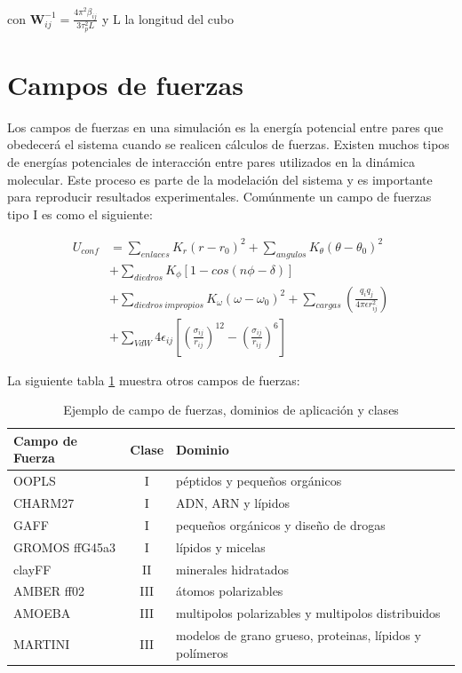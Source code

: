 con $\mathbf{W}^{-1}_{ij}=\frac{4\pi^2 \beta_{ij}}{3\tau_{p}^2 L}$ y L la longitud del cubo

\section{Campos de fuerzas}

Los campos de fuerzas en una simulación es la energía potencial entre pares que obedecerá el sistema cuando se realicen cálculos de fuerzas. Existen muchos tipos de energías potenciales de interacción entre pares utilizados en la dinámica molecular. Este proceso es parte de la modelación del sistema y es importante para reproducir resultados experimentales. Comúnmente un campo de fuerzas tipo I es como el siguiente:

\begin{align*}\label{FF}
    U_{conf} &= \sum_{enlaces}K_r\left(r-r_0\right)^2 + \sum_{angulos}K_{\theta}\left(\theta-\theta_0\right)^2 \\
             &+ \sum_{diedros}K_{\phi}\left[1-cos(n\phi-\delta)\right] \\
             &+ \sum_{diedros\ impropios}K_{\omega}\left(\omega-\omega_0\right)^2 + \sum_{cargas}\left(\frac{q_i q_j}{4\pi \epsilon r^2_{ij}}\right) \\
             &+ \sum_{VdW} 4 \epsilon_{ij}\left[\left(\frac{\sigma_{ij}}{r_{ij}}\right)^{12}-\left(\frac{\sigma_{ij}}{r_{ij}}\right)^{6}\right]    
\end{align*}

La siguiente tabla \ref{FFallen} muestra otros campos de fuerzas:

\begin{table}[h!]
    \centering
    \begin{tabular}{l c l}
    \hline
    Campo de Fuerza & Clase & Dominio \\
    \hline
    OOPLS & I & péptidos y pequeños orgánicos \\
    CHARM27 & I & ADN, ARN y lípidos \\
    GAFF & I & pequeños orgánicos y diseño de drogas \\
    GROMOS ffG45a3 & I & lípidos y micelas\\
    clayFF & II & minerales hidratados \\
    AMBER ff02 & III & átomos polarizables \\
    AMOEBA & III & multipolos polarizables y multipolos distribuidos \\
    MARTINI & III & modelos de grano grueso, proteinas, lípidos y polímeros \\
    \hline
    \end{tabular}
    \caption{Ejemplo de campo de fuerzas, dominios de aplicación y clases\cite{Allen2017}}
    \label{FFallen}
\end{table}

